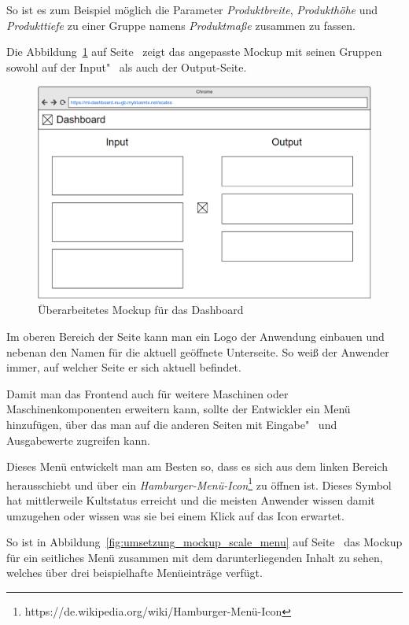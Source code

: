 So ist es zum Beispiel möglich die Parameter \textit{Produktbreite}, \textit{Produkthöhe} und \textit{Produkttiefe} zu
einer Gruppe namens \textit{Produktmaße} zusammen zu fassen.

Die Abbildung~\ref{fig:umsetzung_mockup_scale_2} auf Seite~\pageref{fig:umsetzung_mockup_scale_2} zeigt das angepasste
Mockup mit seinen Gruppen sowohl auf der Input"~ als auch der Output-Seite.

\begin{figure}[h]
    \centering
    \includegraphics[width=\textwidth]{images/kapitel_4/mockup_scale_2.png}
    \caption{Überarbeitetes Mockup für das Dashboard}
    \label{fig:umsetzung_mockup_scale_2}
\end{figure}

Im oberen Bereich der Seite kann man ein Logo der Anwendung einbauen und nebenan den Namen für die aktuell geöffnete
Unterseite. So weiß der Anwender immer, auf welcher Seite er sich aktuell befindet.

Damit man das Frontend auch für weitere Maschinen oder Maschinenkomponenten erweitern kann, sollte der Entwickler ein
Menü hinzufügen, über das man auf die anderen Seiten mit Eingabe"~ und Ausgabewerte zugreifen kann.

Dieses Menü entwickelt man am Besten so, dass es sich aus dem linken Bereich herausschiebt und über ein
\textit{Hamburger-Menü-Icon}\footnote{https://de.wikipedia.org/wiki/Hamburger-Menü-Icon} zu öffnen ist. Dieses Symbol
hat mittlerweile Kultstatus erreicht und die meisten Anwender wissen damit umzugehen oder wissen was sie bei einem Klick
auf das Icon erwartet.

So ist in Abbildung~\ref{fig:umsetzung_mockup_scale_menu} auf Seite~\pageref{fig:umsetzung_mockup_scale_menu} das Mockup
für ein seitliches Menü zusammen mit dem darunterliegenden Inhalt zu sehen, welches über drei beispielhafte Menüeinträge
verfügt.

